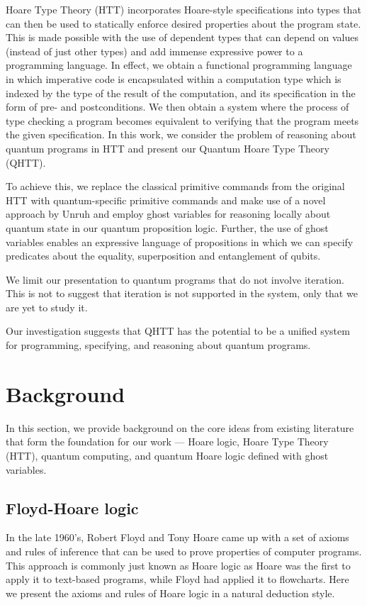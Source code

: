 \documentclass[adraft,creativecommons]{eptcs}
\theoremstyle{definition}
\theoremstyle{remark}
\begin{document}
Hoare Type Theory (HTT) incorporates Hoare-style specifications into types that can then be used to statically enforce desired properties about the program state. This is made possible with the use of dependent types that can depend on values (instead of just other types) and add immense expressive power to a programming language. In effect, we obtain a functional programming language in which imperative code is encapsulated within a computation type which is indexed by the type of the result of the computation, and its specification in the form of pre- and postconditions. We then obtain a system where the process of type checking a program becomes equivalent to verifying that the program meets the given specification. In this work, we consider the problem of reasoning about quantum programs in HTT and present our Quantum Hoare Type Theory (QHTT).

To achieve this, we replace the classical primitive commands from the original HTT with quantum-specific primitive commands and make use of a novel approach by Unruh \cite{unruh2019} and employ ghost variables for reasoning locally about quantum state in our quantum proposition logic. Further, the use of ghost variables enables an expressive language of propositions in which we can specify predicates about the equality, superposition and entanglement of qubits.

We limit our presentation to quantum programs that do not involve iteration. This is not to suggest that iteration is not supported in the system, only that we are yet to study it.

Our investigation suggests that QHTT has the potential to be a unified system for programming, specifying, and reasoning about quantum programs.

\section{Background}
In this section, we provide background on the core ideas from existing literature that form the foundation for our work --- Hoare logic, Hoare Type Theory (HTT), quantum computing, and quantum Hoare logic defined with ghost variables.

\subsection{Floyd-Hoare logic}
In the late 1960's, Robert Floyd and Tony Hoare came up with a set of axioms and rules of inference that can be used to prove properties of computer programs. This approach is commonly just known as Hoare logic as Hoare was the first to apply it to text-based programs, while Floyd had applied it to flowcharts. Here we present the axioms and rules of Hoare logic in a natural deduction style.
\end{document}

